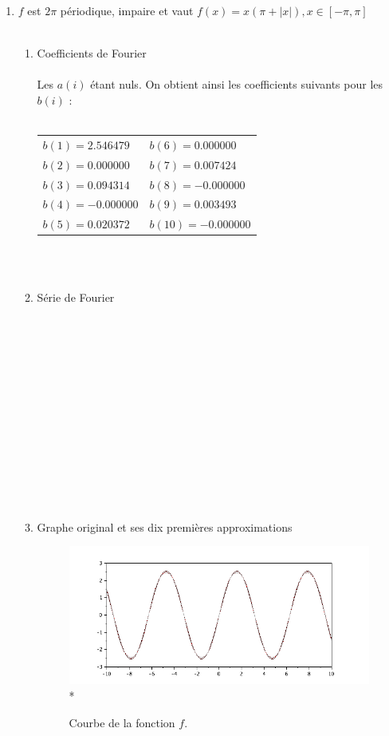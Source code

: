 \documentclass[a4paper,12pt]{report}
\begin{document}
\begin{enumerate}
		\item $f$ est $2\pi$ périodique, impaire et vaut $f(x)=x(\pi + |x|), x \in [-\pi,\pi]$ \\ \\
		\begin{enumerate}
			\item Coefficients de Fourier \\ \\
			Les $a(i)$ étant nuls. On obtient ainsi les coefficients suivants pour les $b(i)$ : \\ \\
			\begin{tabular}{l l}
				$b(1) = 2.546479$ & \hspace*{2cm}$b(6) = 0.000000$\\
				$b(2) = 0.000000$ & \hspace*{2cm}$b(7) = 0.007424$\\
				$b(3) = 0.094314$ & \hspace*{2cm}$b(8) = -0.000000$\\
				$b(4) = -0.000000$ & \hspace*{2cm}$b(9) = 0.003493$\\
				$b(5) = 0.020372$ & \hspace*{2cm}$b(10) = -0.000000$\\
			\end{tabular}\\ \\
			\item Série de Fourier \\ \\ \\ \\ \\ \\ \\ \\ \\ \\ \\ \\ \\ \\

			\item Graphe original et ses dix premières approximations
			\begin{figure}[h!]
				\centering
				\includegraphics[scale=0.6]{ex1_fig5_1.png}\\*
				\caption{\label{ex1_figure5_1}Courbe de la fonction $f$.}
			\end{figure}\\
		

\end{enumerate}
\end{enumerate}
\end{document}
